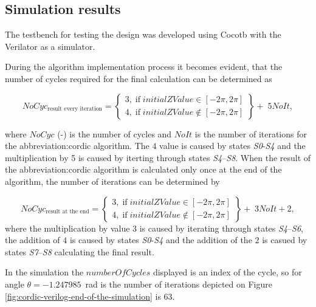 \documentclass[a4paper, twoside, 11pt]{article}
\begin{document}
    \subsection{Simulation results}
    The testbench for testing the design was developed using Cocotb \cite{cocotb} with the Verilator \cite{verilator} as a simulator.\par
    During the algorithm implementation process it becomes evident, that the number of cycles required for the final calculation can be determined as

    \begin{equation}
                NoCyc_\text{result every iteration} = 
                \left\{
                \begin{array}{lr}
                    3,\;\text{if}\;initialZValue \in [-2 \pi, 2 \pi]\\
                    4,\;\text{if}\;initialZValue \notin [-2 \pi, 2 \pi]
                \end{array}
                \right\}
         + \;5 NoIt,
    \end{equation}

    where $NoCyc$ (-) is the number of cycles and $NoIt$ is the number of iterations for the \gls{abbreviation:cordic} algorithm. The $4$ value is caused by states \textit{S0}-\textit{S4} and the multiplication by 5 is caused by iterting through states \textit{S4}–\textit{S8}. When the result of the \gls{abbreviation:cordic} algorithm is calculated only once at the end of the algorithm, the number of iterations can be determined by

    \begin{equation}
        NoCyc_\text{result at the end} = 
                \left\{
                \begin{array}{lr}
                    3,\;\text{if}\;initialZValue \in [-2 \pi, 2 \pi]\\
                    4,\;\text{if}\;initialZValue \notin [-2 \pi, 2 \pi]
                \end{array}
                \right\}
            +\;3 NoIt + 2,
    \end{equation}
    where the multiplication by value 3 is caused by iterating through states \textit{S4}–\textit{S6}, the addition of $4$ is caused by states \textit{S0}-\textit{S4} and the addition of the $2$ is casued by states \textit{S7}–\textit{S8} calculating the final result.\par
    \par
    In the simulation the $numberOfCycles$ displayed is an index of the cycle, so for angle $\theta = -1.247985$~rad is the number of iterations depicted on Figure \ref{fig:cordic-verilog-end-of-the-simulation} is $63$.
\end{document}
